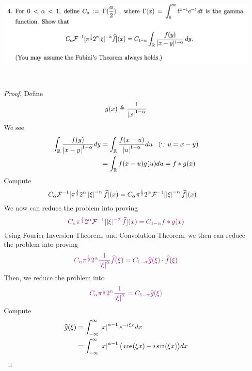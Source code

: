 \documentclass{report}
\begin{document}
\begin{question}{}{}
\includegraphics[height=5cm,width=18cm]{hw3q4}
\end{question}
\begin{proof}
Define 
\begin{align*}
g(x)\triangleq \frac{1}{\left|x\right|^{1-\alpha }}
\end{align*}
We see 
\begin{align*}
\int_{\mathbb{R}} \frac{f(y)}{\left|x-y\right|^{1-\alpha }}dy&=\int_{\mathbb{R}} \frac{f(x-u)}{\left|u\right|^{1-\alpha }}du\hspace{0.3cm}(\because u=x-y)\\
&=\int_{\mathbb{R}} f(x-u)g(u)du=f*g(x)
\end{align*}
Compute 
\begin{align*}
C_{\alpha }\mathcal{F}^{-1}[\pi^{\frac{1}{2}}2^{\alpha }\left|\xi\right|^{-\alpha }\widehat{f}](x)&=C_\alpha \pi^{\frac{1}{2}}2^{\alpha } \mathcal{F}^{-1}[\left|\xi\right|^{-\alpha } \widehat{f}](x)
\end{align*}
We now can reduce the problem into proving 
\begin{align*}
\textcolor{violet}{C_\alpha \pi^{\frac{1}{2}}2^{\alpha } \mathcal{F}^{-1}[\left|\xi\right|^{-\alpha } \widehat{f}](x)=C_{1-\alpha }f* g(x)}
\end{align*}
Using Fourier Inversion Theorem, and Convolution Theorem, we then can reduce the problem into proving  
\begin{align*}
  \textcolor{violet}{C_\alpha \pi^{\frac{1}{2}}2^{\alpha } \frac{1}{\left|\xi\right|^{\alpha }} \widehat{f}(\xi)=C_{1-\alpha }\widehat{g}(\xi)\cdot \widehat{f}(\xi)}
\end{align*}
Then, we reduce the problem into 
\begin{align*}
\textcolor{violet}{C_\alpha \pi^{\frac{1}{2}}2^{\alpha }\frac{1}{\left|\xi\right|^{\alpha }}=C_{1-\alpha }\widehat{g}(\xi)}
\end{align*}
Compute 
\begin{align*}
\widehat{g}(\xi)&=\int_{-\infty}^{\infty} \abso{x}^{\alpha -1}e^{-i \xi x}dx\\
&=\int_{-\infty}^{\infty} \abso{x}^{\alpha -1}\big(\cos (\xi x)- i \sin (\xi x) \big)dx\\

\end{align*}
\end{proof}
\end{document}

